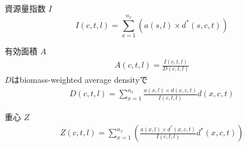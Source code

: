 \documentclass[11pt]{article}
\begin{document}
資源量指数 $I$
\begin{dmath}
I(c,t,l) = \sum_{x=1}^{n_x}(a(s,l) \times d^*(s,c,t)) 
\end{dmath}
\hrulefill

有効面積 $A$
\begin{eqnarray}
A(c,t,l) = \frac{I(c,t,l)}{D(c,t,l)}
\end{eqnarray}
\hspace{1.5cm}$D$はbiomass-weighted average densityで
\begin{eqnarray}
D(c,t,l) = \sum_{x=1}^{n_x}\frac{a(x,l) \times d(x,c,t)}{I(c,t,l)} d(x,c,t)
\end{eqnarray}
\hrulefill

重心 $Z$
\begin{eqnarray}
Z(c,t,l) = \sum_{x = 1}^{n_x}\left(\frac{a(x,l) \times d^{*}(x,c,t)}{I(c,t,l)}d^*(x,c,t) \right)
\end{eqnarray}

\end{document}
